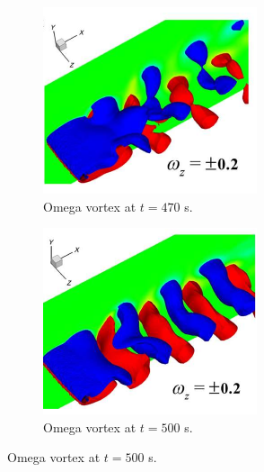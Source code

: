 \documentclass[oneside]{utmthesis}
\begin{document}
  \begin{figure}[!h]
    \centering
    \begin{subfigure}[h]{0.45\textwidth}
      \includegraphics[width=\textwidth]{figs/omegaVortexB}
      \caption{Omega vortex at $t=470$ s.}
      \label{fig:omegaVortexB}
    \end{subfigure}

    \begin{subfigure}[h]{0.45\textwidth}
      \includegraphics[width=\textwidth]{figs/omegaVortexC}
      \caption{Omega vortex at $t=500$ s.}
      \label{fig:omegaVortexC}
    \end{subfigure}


\end{figure}
\end{document}
